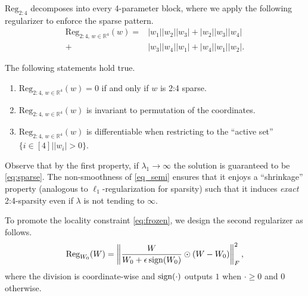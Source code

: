 $\text{Reg}_{2:4}$ decomposes into every 4-parameter block, where we apply the following regularizer \cite{ann_paper} to enforce the sparse pattern.
{\small
\begin{equation}\label{eq_semi}
\begin{aligned}
\text{Reg}_{2:4, \, w \in \mathbb{R}^4}(w) =  & |w_1||w_2||w_3| + |w_2||w_3||w_4| \\
  + & |w_3||w_4||w_1| + |w_4||w_1||w_2|.
\end{aligned}
\end{equation}
}
\begin{proposition}\label{prop:24}
The following statements hold true.
\begin{enumerate}
    \item $\text{Reg}_{2:4, \, w \in \mathbb{R}^4}(w) = 0 $ if and only if $w$ is 2:4 sparse.
    \item $\text{Reg}_{2:4, \, w \in \mathbb{R}^4}(w)$ is invariant to permutation of the coordinates.
    \item $\text{Reg}_{2:4, \, w \in \mathbb{R}^4}(w)$ is differentiable when restricting to the ``active set'' $\{i\in[4]||w_i|>0\}$.
\end{enumerate}
\end{proposition}
Observe that by the first property, if $\lambda_1 \rightarrow \infty$ the solution is guaranteed to be \eqref{eq:sparse}. The non-smoothness of \eqref{eq_semi} ensures that it enjoys a ``shrinkage'' property (analogous to $\ell_1$-regularization for sparsity) such that it induces \emph{exact} 2:4-sparsity even if $\lambda$ is not tending to $\infty$.

To promote the locality constraint \eqref{eq:frozen}, we design the second regularizer as follows.
$$\text{Reg}_{W_0}(W) = \left\|\frac{W}{W_0 + \epsilon \operatorname{sign}(W_0)} \odot (W - W_0)\right\|_F^2,$$
where the division is coordinate-wise and $\operatorname{sign}(\cdot)$ outputs $1$ when $\cdot \geq 0$ and $0$ otherwise.


